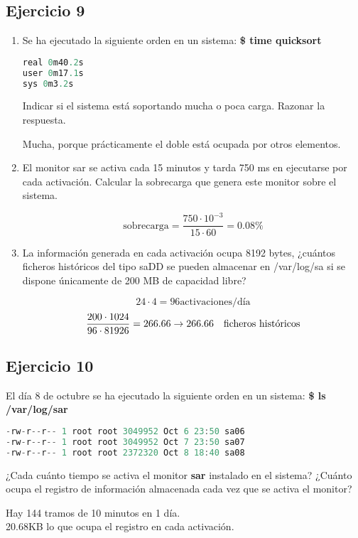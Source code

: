 \subsection{Ejercicio 9}
\begin{enumerate}
    \item Se ha ejecutado la siguiente orden en un sistema: \textbf{\$ time quicksort}
\begin{lstlisting}[language=C]
real 0m40.2s
user 0m17.1s
sys 0m3.2s
\end{lstlisting}    
Indicar si el sistema está soportando mucha o poca carga. Razonar la respuesta.
\begin{tcolorbox}[colback=white,colframe=cyan!50!black,fonttitle=\bfseries]
Mucha, porque prácticamente el doble está ocupada por otros elementos.
\end{tcolorbox}
\item El monitor sar se activa cada 15 minutos y tarda 750 ms en ejecutarse por cada activación. Calcular la sobrecarga que genera este monitor sobre el sistema.
\begin{tcolorbox}[colback=white,colframe=cyan!50!black,fonttitle=\bfseries]
\[
\text{sobrecarga}=\dfrac{750\cdot 10^{-3}}{15\cdot 60}=0.08\%
\]
\end{tcolorbox}
\item La información generada en cada activación ocupa 8192 bytes, ¿cuántos ficheros históricos del tipo saDD se pueden almacenar en /var/log/sa si se dispone únicamente de 200 MB de capacidad libre?
\begin{tcolorbox}[colback=white,colframe=cyan!50!black,fonttitle=\bfseries]
\[
24\cdot 4=96\text{activaciones/día}
\]
\[
\dfrac{200\cdot 1024}{96\cdot 81926}=266.66\rightarrow 266.66\quad\text{ficheros históricos}
\]
\end{tcolorbox}
\end{enumerate}
\subsection{Ejercicio 10}
\noindent
El día 8 de octubre se ha ejecutado la siguiente orden en un sistema: \textbf{\$ ls /var/log/sar}
\begin{lstlisting}[language=C]
-rw-r--r-- 1 root root 3049952 Oct 6 23:50 sa06
-rw-r--r-- 1 root root 3049952 Oct 7 23:50 sa07
-rw-r--r-- 1 root root 2372320 Oct 8 18:40 sa08
\end{lstlisting} 
¿Cada cuánto tiempo se activa el monitor \textbf{sar} instalado en el sistema? ¿Cuánto ocupa el registro de información almacenada cada vez que se activa el monitor?
\begin{tcolorbox}[colback=white,colframe=cyan!50!black,fonttitle=\bfseries]
Hay 144 tramos de 10 minutos en 1 día.\\
20.68KB lo que ocupa el registro en cada activación.
\end{tcolorbox}